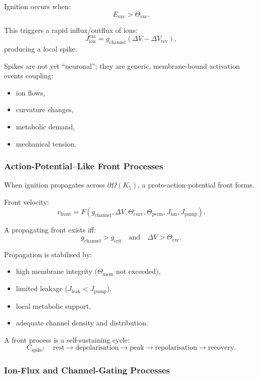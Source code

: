 Ignition occurs when:
\[
E_{\text{exc}} > \Theta_{\text{exc}}.
\]

This triggers a rapid influx/outflux of ions:
\[
J_{\text{ion}}^{\text{exc}} = g_{\text{channel}}(\Delta V - \Delta V_{\text{rev}}),
\]
producing a local spike.

Spikes are not yet “neuronal”; they are generic, membrane-bound
activation events coupling:
\begin{itemize}
    \item ion flows,
    \item curvature changes,
    \item metabolic demand,
    \item mechanical tension.
\end{itemize}

\subsubsection{Action-Potential–Like Front Processes}

When ignition propagates across $\partial\Omega(K_5)$, a
proto-action-potential front forms.

Front velocity:
\[
v_{\text{front}} =
F(g_{\text{channel}}, \Delta V, \Theta_{\text{curv}},
\Theta_{\text{perm}}, J_{\text{ion}}, J_{\text{pump}}).
\]

A propagating front exists iff:
\[
g_{\text{channel}} > g_{\text{crit}}
\quad\text{and}\quad
\Delta V > \Theta_{\text{exc}}.
\]

Propagation is stabilised by:
\begin{itemize}
    \item high membrane integrity ($\Theta_{\text{mem}}$ not exceeded),
    \item limited leakage ($J_{\text{leak}} < J_{\text{pump}}$),
    \item local metabolic support,
    \item adequate channel density and distribution.
\end{itemize}

A front process is a self-sustaining cycle:
\[
C_{\text{spike}}:\quad
\text{rest} \to \text{depolarisation} \to
\text{peak} \to \text{repolarisation} \to \text{recovery}.
\]

\subsubsection{Ion-Flux and Channel-Gating Processes}

